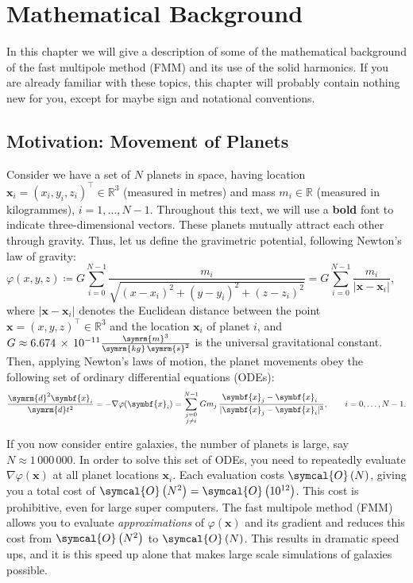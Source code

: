 \documentclass{scrbook}
\newcommand{\reals}{\ensuremath{\mathbb{R}}}
\newcommand{\wholespace}{\ensuremath{\reals^3}}
\newcommand{\vv}[1]{\ensuremath{\symbf{#1}}} %
\newcommand{\dd}{\ensuremath{\symrm{d}}}     %
\newcommand{\bigO}[1]{\ensuremath{\symcal{O}\left({#1}\right)}}
\begin{document}
\chapter{Mathematical Background}\label{chp:mathbackground}
In this chapter we will give a description of some of the mathematical
background of the fast multipole method (FMM) and its use of the solid
harmonics. If you are already familiar with these topics, this chapter will
probably contain nothing new for you, except for maybe sign and notational
conventions.

\section{Motivation: Movement of Planets}
Consider we have a set of $N$ planets in space, having location
$\vv{x}_i = (x_i,y_i,z_i)^\top\in\wholespace$ (measured in metres) and mass
$m_i\in\reals$ (measured in kilogrammes), $i=1,\dotsc,N-1$. Throughout this
text, we will use a \textbf{bold} font to indicate three-dimensional vectors.
These planets mutually attract each other through gravity. Thus, let us define
the gravimetric potential, following Newton's law of gravity:
\begin{equation}\label{eqn:gravimetric-potential}
\varphi(x,y,z)\coloneqq
G\sum_{i=0}^{N-1}\frac{m_i}{\sqrt{(x-x_i)^2 + 
(y-y_i)^2 + (z-z_i)^2}} = 
G\sum_{i=0}^{N-1}\frac{m_i}{|\vv{x}-\vv{x}_i|},
\qquad
\end{equation}
where $|\vv{x}-\vv{x}_i|$ denotes the Euclidean distance between the point
$\vv{x}=(x,y,z)^\top\in\wholespace$ and the location $\vv{x}_i$ of planet $i$,
and $G\approx6.674\,\times\,10^{-11}\frac{\symrm{m}^3}{\symrm{kg}\,\symrm{s}^2}$
is the universal gravitational constant. Then, applying Newton's laws of
motion, the planet movements obey the following set of ordinary differential
equations (ODEs):
\begin{equation}
\frac{\dd^2\vv{x}_i}{\dd t^2} = -\nabla\varphi(\vv{x}_i) =
\sum_{\substack{j=0\\j\neq i}}^{N-1}
Gm_j\,\frac{\phantom{|}\vv{x}_j-\vv{x}_i\phantom{|^3}}{|\vv{x}_j-\vv{x}_i|^3},
\qquad i = 0,\dotsc,N-1.
\end{equation}

If you now consider entire galaxies, the number of planets is large, say
$N\approx 1\,000\,000$. In order to solve this set of ODEs, you need to
repeatedly evaluate $\nabla\varphi(\vv{x})$ at all planet locations
$\vv{x}_i$. Each evaluation costs \bigO{N}, giving you a total cost of
$\bigO{N^2}=\bigO{10^{12}}$. This cost is prohibitive, even for large super
computers. The fast multipole method (FMM) allows you to evaluate
\emph{approximations} of $\varphi(\vv{x})$ and its gradient and reduces this
cost from \bigO{N^2} to \bigO{N}. This results in dramatic speed ups, and it 
is this speed up alone that makes large scale simulations of galaxies possible.
\end{document}
